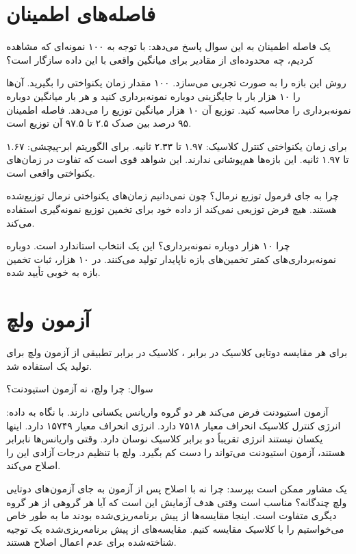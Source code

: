 \documentclass[12pt, a4paper]{article}
\newcommand{\dash}{\lr{---}}
\begin{document}
\section{فاصله‌های اطمينان }

يک فاصله اطمينان به اين سوال پاسخ می‌دهد: با توجه به ۱۰۰ نمونه‌ای که مشاهده کرديم، چه محدوده‌ای از مقادير برای ميانگين واقعی با اين داده سازگار است؟

روش  اين بازه را به صورت تجربی می‌سازد. ۱۰۰ مقدار زمان يکنواختی را بگيريد. آن‌ها را ۱۰ هزار بار با جايگزينی دوباره نمونه‌برداری کنيد و هر بار ميانگين دوباره نمونه‌برداری را محاسبه کنيد. توزيع آن ۱۰ هزار ميانگين توزيع  را می‌دهد. فاصله اطمينان ۹۵ درصد بين صدک ۲.۵ تا ۹۷.۵ آن توزيع است.

برای زمان يکنواختی کنترل کلاسيک: ۱.۹۷ تا ۲.۳۳ ثانيه. برای الگوريتم ابر-پيچشی: ۱.۶۷ تا ۱.۹۷ ثانيه. اين بازه‌ها هم‌پوشانی ندارند. اين شواهد قوی است که تفاوت در زمان‌های يکنواختی واقعی است.

چرا  به جای فرمول توزيع نرمال؟ چون نمی‌دانيم زمان‌های يکنواختی نرمال توزيع‌شده هستند.  هيچ فرض توزيعی نمی‌کند \dash{} از داده خود برای تخمين توزيع نمونه‌گيری استفاده می‌کند.

چرا ۱۰ هزار دوباره نمونه‌برداری؟ اين يک انتخاب استاندارد است. دوباره نمونه‌برداری‌های کمتر تخمين‌های بازه ناپايدار توليد می‌کنند. در ۱۰ هزار، ثبات تخمين بازه به خوبی تأييد شده.

\section{آزمون  ولچ}

برای هر مقايسه دوتايی \dash{} کلاسيک در برابر ، کلاسيک در برابر تطبيقی \dash{} از آزمون  ولچ برای توليد يک  استفاده شد.

سوال: چرا ولچ، نه آزمون  استيودنت؟

آزمون  استيودنت فرض می‌کند هر دو گروه واريانس يکسانی دارند. با نگاه به داده: انرژی کنترل کلاسيک انحراف معيار ۷۵۱۸ دارد. انرژی  انحراف معيار ۱۵۷۴۹ دارد. اينها يکسان نيستند \dash{} انرژی  تقريباً دو برابر کلاسيک نوسان دارد. وقتی واريانس‌ها نابرابر هستند، آزمون  استيودنت می‌تواند  را دست کم بگيرد.  ولچ با تنظيم درجات آزادی اين را اصلاح می‌کند.

يک مشاور ممکن است بپرسد: چرا نه  با اصلاح پس از آزمون به جای آزمون‌های دوتايی ولچ چندگانه؟  مناسب است وقتی هدف آزمايش اين است که آيا هر گروهی از هر گروه ديگری متفاوت است. اينجا مقايسه‌ها از پيش برنامه‌ريزی‌شده بودند \dash{} ما به طور خاص می‌خواستيم  را با کلاسيک مقايسه کنيم. مقايسه‌های از پيش برنامه‌ريزی‌شده يک توجيه شناخته‌شده برای عدم اعمال اصلاح  هستند.
\end{document}
